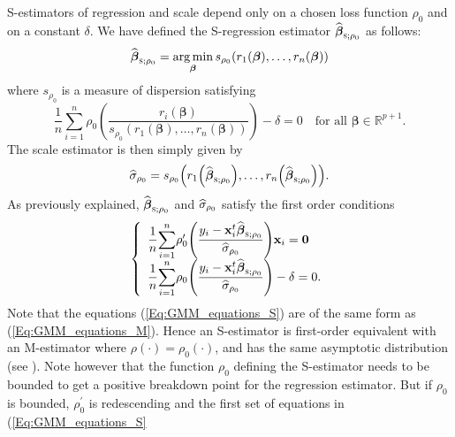 S-estimators of regression and scale depend only on a chosen loss function
$\rho_{0}$ and on a constant $\delta$. We have defined the S-regression
estimator $\sthat{\boldsymbol\beta}_{\stsc{S};\rho_{0}}$ as follows:
\begin{equation}
\sthat{\boldsymbol\beta}_{\stsc{S};\rho_{0}}=\argmin_{\boldsymbol{\beta
}}s_{\rho_{0}}\left(  r_{1}\left(  \boldsymbol\beta\right)  ,\ldots
,r_{n}\left(  \boldsymbol\beta\right)  \right)  \label{eq:S_min_rho0}%
\end{equation}
where $s_{\rho_{0}}$ is a measure of dispersion satisfying
\[
\frac{1}{n}\sum_{i=1}^{n}\rho_{0}\left(  \frac{r_{i}\left(  \boldsymbol{\beta
}\right)  }{s_{\rho_{0}}\left(  r_{1}\left(  \boldsymbol\beta\right)
,\ldots,r_{n}\left(  \boldsymbol\beta\right)  \right)  }\right)
-\delta=0\quad\text{for all }\boldsymbol\beta\in\mathbb{R}^{p+1}.
\]
The scale estimator is then simply given by
\[
\sthat{\sigma}_{\rho_{0}}=s_{\rho_{0}}\left(  r_{1}\left(  \widehat
{\boldsymbol\beta}_{\stsc{S};\rho_{0}}\right)  ,\ldots,r_{n}\left(
\sthat{\boldsymbol\beta}_{\stsc{S};\rho_{0}}\right)  \right)  .
\]
As previously explained, $\sthat{\boldsymbol\beta}_{\stsc{S};\rho_{0}}$
and $\widehat{\sigma}_{\rho_{0}}$ satisfy the first order conditions
\begin{equation}
\left\{
\begin{array}
[c]{l}%
\dfrac{1}{n}%
{\displaystyle\sum\limits_{i=1}^{n}}
\rho_{0}^{\prime}\left(  \dfrac{y_{i}-\stvec{x}_{i}^{t}\widehat
{\boldsymbol\beta}_{\stsc{S};\rho_{0}}}{\sthat{\sigma}_{\rho_{0}}%
}\right)  \stvec{x}_{i}=\stvec{0}\\
\dfrac{1}{n}%
{\displaystyle\sum\limits_{i=1}^{n}}
\rho_{0}\left(  \dfrac{y_{i}-\stvec{x}_{i}^{t}\sthat{\boldsymbol\beta%
}_{\stsc{S};\rho_{0}}}{\sthat{\sigma}_{\rho_{0}}}\right)  -\delta=0.
\end{array}
\right.  \label{Eq:GMM_equations_S}%
\end{equation}
Note that the equations (\ref{Eq:GMM_equations_S}) are of the same form as
(\ref{Eq:GMM_equations_M}). Hence an S-estimator is first-order equivalent
with an M-estimator where $\rho\left(  \cdot\right)  =\rho_{0}\left(
\cdot\right)  $, and has the same asymptotic distribution (see
\citealp{rousseeuw:yohai:1984}). Note however that the function $\rho_{0}$
defining the S-estimator needs to be bounded to get a positive breakdown point
for the regression estimator. But if $\rho_{0}$ is bounded, $\rho_{0}^{\prime
}$ is redescending and the first set of equations in (\ref{Eq:GMM_equations_S}%
